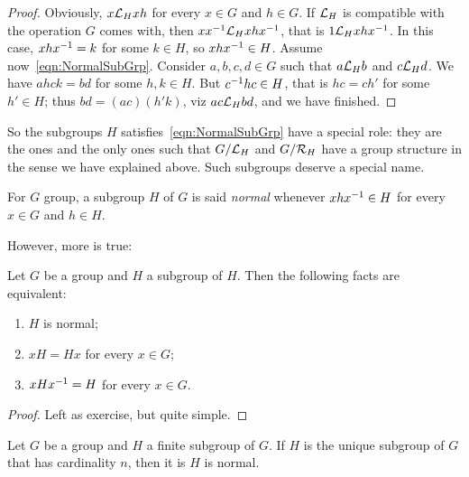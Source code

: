 \begin{proof}
Obviously, \(x \mathcal L_H xh\) for every \(x \in G\) and \(h \in G\). If \(\mathcal L_H\) is compatible with the operation \(G\) comes with, then \(x x^{-1} \mathcal L_H x h x^{-1}\), that is \(1 \mathcal L_H x h x^{-1}\). In this case, \(x h x^{-1} = k\) for some \(k \in H\), so \(xhx^{-1} \in H\).\newline
Assume now~\eqref{eqn:NormalSubGrp}. Consider \(a, b, c, d \in G\) such that \(a \mathcal L_H b\) and \(c \mathcal L_H d\). We have \(ahck=bd\) for some \(h, k \in H\). But \(c^{-1}hc \in H\), that is \(hc = c h'\) for some \(h' \in H\); thus \(bd = (ac)(h'k)\), viz \(ac \mathcal L_H bd\), and we have finished.
\end{proof}

So the subgroups \(H\) satisfies~\eqref{eqn:NormalSubGrp} have a special role: they are the ones and the only ones such that \(G/\mathcal L_H\) and \(G/\mathcal R_H\) have a group structure in the sense we have explained above. Such subgroups deserve a special name.

\begin{definition}
For \(G\) group, a subgroup \(H\) of \(G\) is said {\em normal} whenever \(xhx^{-1} \in H\) for every \(x \in G\) and \(h \in H\).
\end{definition}

However, more is true:

\begin{proposition}
Let \(G\) be a group and \(H\) a subgroup of \(H\). Then the following facts are equivalent:
\begin{enumerate}
\item \(H\) is normal;
\item \(xH = Hx\) for every \(x \in G\);
\item \(xHx^{-1} = H\) for every \(x \in G\).
\end{enumerate}
\end{proposition}

\begin{proof}
Left as exercise, but quite simple.
\end{proof}

\begin{corollary}
Let \(G\) be a group and \(H\) a finite subgroup of \(G\). If \(H\) is the unique subgroup of \(G\) that has cardinality \(n\), then it is \(H\) is normal.
\end{corollary}

